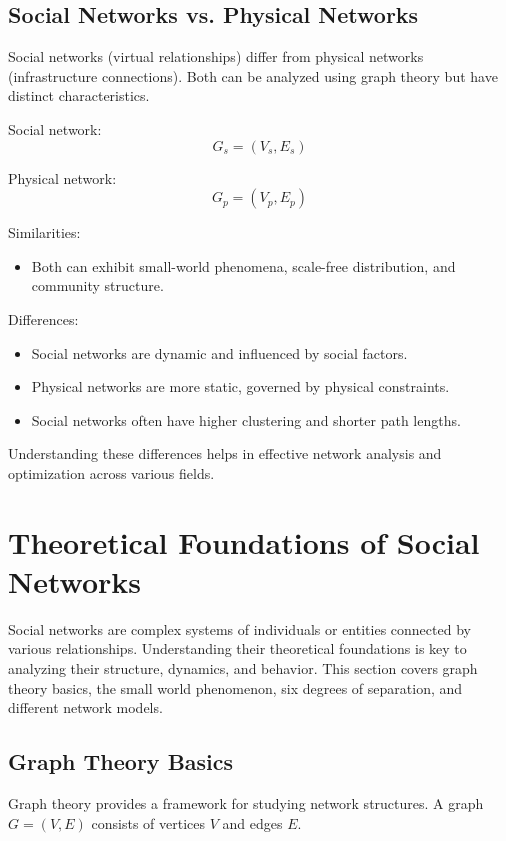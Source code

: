 \documentclass[12pt]{book} %
\begin{document}
\subsection{Social Networks vs. Physical Networks}

Social networks (virtual relationships) differ from physical networks (infrastructure connections). Both can be analyzed using graph theory but have distinct characteristics.

Social network:
\[
G_s = (V_s, E_s)
\]

Physical network:
\[
G_p = (V_p, E_p)
\]

Similarities:

\begin{itemize}
    \item Both can exhibit small-world phenomena, scale-free distribution, and community structure.
\end{itemize}

Differences:

\begin{itemize}
    \item Social networks are dynamic and influenced by social factors.
    \item Physical networks are more static, governed by physical constraints.
    \item Social networks often have higher clustering and shorter path lengths.
\end{itemize}

Understanding these differences helps in effective network analysis and optimization across various fields.


\section{Theoretical Foundations of Social Networks}

Social networks are complex systems of individuals or entities connected by various relationships. Understanding their theoretical foundations is key to analyzing their structure, dynamics, and behavior. This section covers graph theory basics, the small world phenomenon, six degrees of separation, and different network models.

\subsection{Graph Theory Basics}

Graph theory provides a framework for studying network structures. A graph \( G = (V, E) \) consists of vertices \( V \) and edges \( E \).
\end{document}
